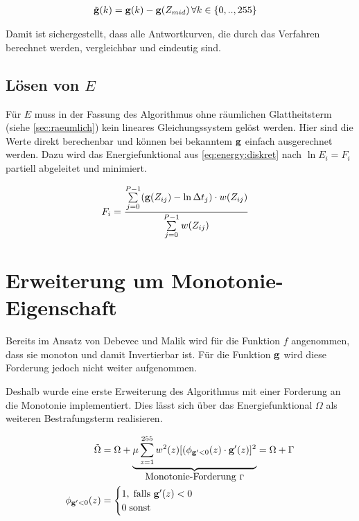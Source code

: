 \begin{align}
\tilde{\mathbf g}(k) &= \mathbf g(k)-\mathbf g(Z_{mid})\, \forall k \in \{0,..,255\}
\end{align}

Damit ist sichergestellt, dass alle Antwortkurven, die durch das Verfahren berechnet werden, vergleichbar und eindeutig sind.



\subsection{Lösen von $E$}
Für $E$ muss in der Fassung des Algorithmus ohne räumlichen Glattheitsterm (siehe \autoref{sec:raeumlich}) kein lineares Gleichungssystem  gelöst werden. Hier sind die Werte direkt berechenbar und können bei bekanntem $\mathbf g$ einfach ausgerechnet werden. Dazu wird das Energiefunktional aus \autoref{eq:energy:diskret} nach $\ln E_i = F_i$ partiell abgeleitet und minimiert.    

\begin{align}
\label{eq:fi:basic}
    F_i &= \frac{\sum \limits_{j=0}^{P-1} (\mathbf g(Z_{ij})-\ln \Delta t_j)\cdot w(Z_{ij})}{\sum \limits_{j=0}^{P-1} w(Z_{ij})}
\end{align}



\section{Erweiterung um Monotonie-Eigenschaft}
\label{sec:monotonie}

Bereits im Ansatz von Debevec und Malik wird für die Funktion $f$ angenommen, dass sie monoton und damit Invertierbar ist. Für die Funktion $\mathbf g$ wird diese Forderung jedoch nicht weiter aufgenommen.

Deshalb wurde eine erste Erweiterung des Algorithmus mit einer Forderung an die Monotonie implementiert. Dies lässt sich über das Energiefunktional $\Omega$ als weiteren Bestrafungsterm realisieren.

\begin{align}
\tilde{\Omega} &= \Omega + \underbrace{\mu \sum \limits_{z=1}^{255} w^2(z) [(\phi_{\mathbf g'<0}(z)\cdot \mathbf g'(z)]^2}_{\mbox{Monotonie-Forderung } \Gamma} = \Omega + \Gamma\\
\phi_{\mathbf g'<0}(z) &= 
    \begin{cases} 
        1, \; \mbox{falls } \mathbf g'(z) < 0\\ 
        0 \; \mbox{sonst}
    \end{cases}
\end{align}

